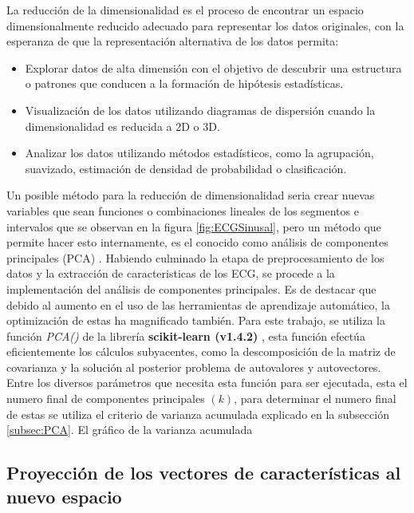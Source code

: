 \documentclass[12pt,letterpaper,oneside,openright]{book}
\begin{document}
La reducción de la dimensionalidad es el proceso de encontrar un espacio dimensionalmente reducido adecuado para representar los datos originales, con la esperanza de que la representación alternativa de los datos permita:
\begin{itemize}
	\item Explorar datos de alta dimensión con el objetivo de descubrir una estructura o patrones que conducen a la formación de hipótesis estadísticas.
	\item Visualización de los datos utilizando diagramas de dispersión cuando la dimensionalidad es reducida a 2D o 3D.
	\item Analizar los datos utilizando métodos estadísticos, como la agrupación, suavizado, estimación de densidad de probabilidad o clasificación.
\end{itemize}

Un posible método para la reducción de dimensionalidad seria crear nuevas variables que sean funciones o combinaciones lineales de los segmentos e intervalos que se observan en la figura \ref{fig:ECGSinusal}, pero un método que permite hacer esto internamente, es el conocido como análisis de componentes principales (PCA) \cite{martinez05}. Habiendo culminado la etapa de preprocesamiento de los datos y la extracción de caracteristicas de los ECG, se procede a la implementación del análisis de componentes principales. Es de destacar que debido al aumento en el uso de las herramientas de aprendizaje automático, la optimización de estas ha magnificado también. Para este trabajo, se utiliza la función \emph{PCA()} de la librería \textbf{scikit-learn (v1.4.2)} \cite{scikit-learn,sklearn_api}, esta función efectúa eficientemente los cálculos subyacentes, como la descomposición de la matriz de covarianza y la solución al posterior problema de autovalores y autovectores. Entre los diversos parámetros que necesita esta función para ser ejecutada, esta el numero final de componentes principales $(k)$, para determinar el numero final de estas se utiliza el criterio de varianza acumulada explicado en la subsección \ref{subsec:PCA}.
El gráfico de la varianza acumulada 

\subsection{Proyección de los vectores de características al nuevo espacio}
\end{document}
